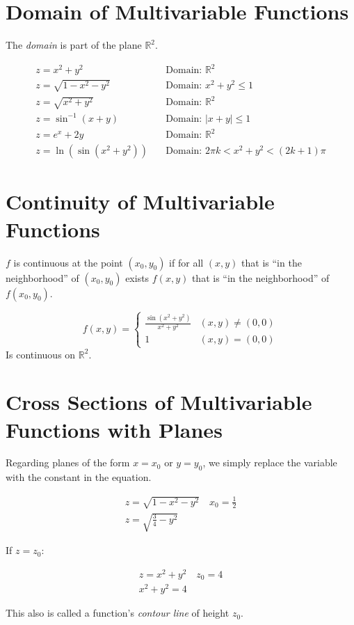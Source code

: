 \documentclass[00_complete]{subfiles}
\begin{document}
\section{Domain of Multivariable Functions}
The \emph{domain} is part of the plane $\mathbb{R}^2$.
\begin{example}
    \begin{align*}
        z=x^2+y^2 &\quad \text{Domain: } \mathbb{R}^2 \\
        z=\sqrt{1-x^2-y^2} &\quad \text{Domain: } x^2+y^2\leq 1 \\
        z=\sqrt{x^2+y^2} &\quad \text{Domain: } \mathbb{R}^2 \\
        z=\sin^{-1}(x+y) &\quad \text{Domain: } |x+y| \leq 1 \\
        z=e^x+2y &\quad \text{Domain: } \mathbb{R}^2 \\
        z=\ln(\sin(x^2+y^2)) &\quad \text{Domain: } 2\pi k < x^2+y^2 <(2k+1)\pi
    \end{align*}
\end{example}
\section{Continuity of Multivariable Functions}
\begin{definition}
    $f$ is continuous at the point $(x_0,y_0)$ if for all $(x,y)$ that is ``in
    the neighborhood'' of $(x_0,y_0)$ exists $f(x,y)$ that is ``in the
    neighborhood'' of $f(x_0,y_0)$.
    \begin{example}
        $$f(x,y)=\begin{cases}
            \frac{\sin(x^2+y^2)}{x^2+y^2} &(x,y) \neq (0,0) \\
            1 & (x,y)=(0,0)
        \end{cases}$$
        Is continuous on $\mathbb{R}^2$.
    \end{example}
\end{definition}
\section{Cross Sections of Multivariable Functions with Planes}
Regarding planes of the form $x=x_0$ or $y=y_0$, we simply replace
the variable with the constant in the equation.
\begin{example}
    \begin{gather*}
        z=\sqrt{1-x^2-y^2} \quad x_0=\frac{1}{2} \\
        z = \sqrt{\frac{3}{4}-y^2}
    \end{gather*}
\end{example}
If $z=z_0$:
\begin{example}
    \begin{gather*}
        z=x^2+y^2 \quad z_0=4 \\
        x^2+y^2=4
    \end{gather*}
\end{example}
This also is called a function's \emph{contour line} of height $z_0$.
\end{document}
